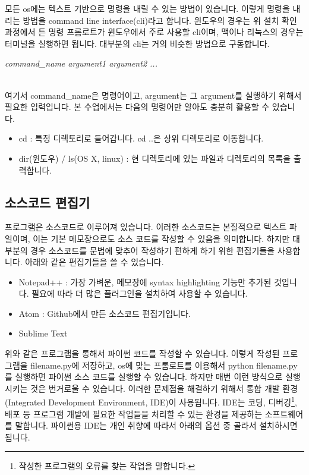 \documentclass[twoside]{article}
\begin{document}
모든 os에는 텍스트 기반으로 명령을 내릴 수 있는 방법이 있습니다. 이렇게 명령을 내리는 방법을 command line interface(cli)라고 합니다. 윈도우의 경우는 위 설치 확인 과정에서 튼 명령 프롬로트가 윈도우에서 주로 사용할 cli이며, 맥이나 리눅스의 경우는 터미널을 실행하면 됩니다.  대부분의 cli는 거의 비슷한 방법으로 구동합니다. \\

\begin{centering} 
\textit{command\_name argument1 argument2 ... }
\end{centering} \\

여기서 command\_name은 명령어이고, argument는 그 argument를 실행하기 위해서 필요한 입력입니다. 본 수업에서는 다음의 명령어만 알아도 충분히 활용할 수 있습니다. 

\begin{itemize}  
\item cd : 특정 디렉토리로 들어갑니다. cd ..은 상위 디렉토리로 이동합니다. 
\item dir(윈도우) / ls(OS X, linux) : 현 디렉토리에 있는 파일과 디렉토리의 목록을 출력합니다.  
\end{itemize}

\subsection{소스코드 편집기}

프로그램은 소스코드로 이루어져 있습니다. 이러한 소스코드는 본질적으로 텍스트 파일이며, 이는 기본 메모장으로도 소스 코드를 작성할 수 있음을 의미합니다. 하지만 대부분의 경우 소스코드를 문법에 맞추어 작성하기 편하게 하기 위한 편집기들을 사용합니다. 아래와 같은 편집기들을 쓸 수 있습니다. 

\begin{itemize} 
\item Notepad++ : 가장 가벼운, 메모장에 syntax highlighting 기능만 추가된 것입니다. 필요에 따라 더 많은 플러그인을 설치하여 사용할 수 있습니다. 
\item Atom : Github에서 만든 소스코드 편집기입니다. 
\item Sublime Text 
\end{itemize}

위와 같은 프로그램을 통해서 파이썬 코드를 작성할 수 있습니다. 이렇게 작성된 프로그램을 filename.py에 저장하고, os에 맞는 프롬로트를 이용해서 python filename.py를 실행하면 파이썬 소스 코드를 실행할 수 있습니다. 하지만 매번 이런 방식으로 실행시키는 것은 번거로울 수 있습니다. 이러한 문제점을 해결하기 위해서 통합 개발 환경(Integrated Development Environment, IDE)이 사용됩니다. IDE는 코딩, 디버깅\footnote{작성한 프로그램의 오류를 찾는 작업을 말합니다.}, 배포 등 프로그램 개발에 필요한 작업들을 처리할 수 있는 환경을 제공하는 소프트웨어를 말합니다. 파이썬용 IDE는 개인 취향에 따라서 아래의 옵션 중 골라서 설치하시면 됩니다. 
\end{document}

